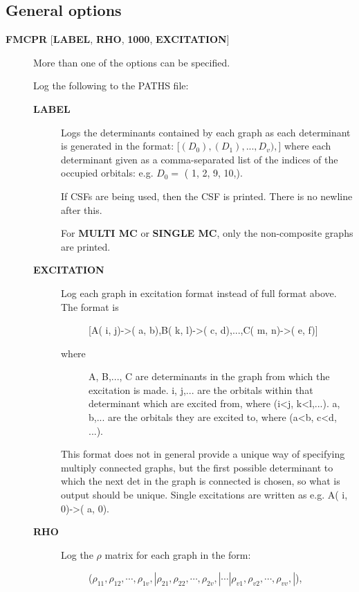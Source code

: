 \documentclass[openany,a4paper,10pt,english]{manual}
\begin{document}
\subsection{General options}
\begin{description}
\item[\textbf{FMCPR} {[}\textbf{LABEL}, \textbf{RHO}, \textbf{1000}, \textbf{EXCITATION}{]}] \leavevmode
More than one of the options can be specified.

Log the following to the PATHS file:
\begin{description}
\item[\textbf{LABEL}] \leavevmode
Logs the determinants contained by each graph as each determinant
is generated in the format:
{[}$(D_0),(D_1),...,D_v),${]}
where each determinant given as a comma-separated list of the
indices of the occupied orbitals:
e.g. $D_0 =$ (    1,    2,    9,   10,).

If CSFs are being used, then the CSF is printed.  There is no newline after this.

For \textbf{MULTI MC} or \textbf{SINGLE MC}, only the non-composite graphs are printed.

\item[\textbf{EXCITATION}] \leavevmode\begin{description}
\item[Log each graph in excitation format instead of full format above.  The format is] \leavevmode
{[}A(    i,    j)-\textgreater{}(    a,    b),B(    k,    l)-\textgreater{}(    c,    d),...,C(    m,    n)-\textgreater{}(    e,    f){]}

\item[where] \leavevmode
A, B,..., C are determinants in the graph from which the excitation is made.
i, j,... are the orbitals within that determinant which are excited from, where (i\textless{}j, k\textless{}l,...).
a, b,... are the orbitals they are excited to, where (a\textless{}b, c\textless{}d, ...).

\end{description}

This format does not in general provide a unique way of
specifying multiply connected graphs, but the first possible
determinant to which the next det in the graph is connected is
chosen, so what is output should be unique.  Single excitations
are written as e.g. A(    i,    0)-\textgreater{}(    a,    0).

\item[\textbf{RHO}] \leavevmode\begin{description}
\item[Log the $\rho$ matrix for each graph in the form:] \leavevmode
($\rho_{11}, \rho_{12}, \cdots, \rho_{1v},| \rho_{21}, \rho_{22}, \cdots, \rho_{2v},| \cdots | \rho_{v1}, \rho_{v2}, \cdots, \rho_{vv},|$),


\end{description}
\end{description}
\end{description}
\end{document}
